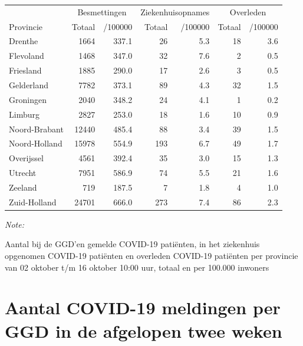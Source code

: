 \documentclass[
  english,
  man,floatsintext]{apa6}
\begin{document}
\begin{table}[H]
\centering
\begin{threeparttable}
\begin{tabular}{lrrrrrr}
\toprule
\multicolumn{1}{c}{ } & \multicolumn{2}{c}{Besmettingen} & \multicolumn{2}{c}{Ziekenhuisopnames} & \multicolumn{2}{c}{Overleden} \\
\cmidrule(l{3pt}r{3pt}){2-3} \cmidrule(l{3pt}r{3pt}){4-5} \cmidrule(l{3pt}r{3pt}){6-7}
Provincie & Totaal & /100000 & Totaal & /100000 & Totaal & /100000\\
\midrule
Drenthe & 1664 & 337.1 & 26 & 5.3 & 18 & 3.6\\
Flevoland & 1468 & 347.0 & 32 & 7.6 & 2 & 0.5\\
Friesland & 1885 & 290.0 & 17 & 2.6 & 3 & 0.5\\
Gelderland & 7782 & 373.1 & 89 & 4.3 & 32 & 1.5\\
Groningen & 2040 & 348.2 & 24 & 4.1 & 1 & 0.2\\
Limburg & 2827 & 253.0 & 18 & 1.6 & 10 & 0.9\\
Noord-Brabant & 12440 & 485.4 & 88 & 3.4 & 39 & 1.5\\
Noord-Holland & 15978 & 554.9 & 193 & 6.7 & 49 & 1.7\\
Overijssel & 4561 & 392.4 & 35 & 3.0 & 15 & 1.3\\
Utrecht & 7951 & 586.9 & 74 & 5.5 & 21 & 1.6\\
Zeeland & 719 & 187.5 & 7 & 1.8 & 4 & 1.0\\
Zuid-Holland & 24701 & 666.0 & 273 & 7.4 & 86 & 2.3\\
\bottomrule
\end{tabular}
\begin{tablenotes}
\item \textit{Note: } 
\item Aantal bij de GGD’en gemelde COVID-19 patiënten, in het ziekenhuis opgenomen COVID-19 patiënten en overleden COVID-19 patiënten per provincie van 02 oktober t/m 16 oktober 10:00 uur, totaal en per 100.000 inwoners
\end{tablenotes}
\end{threeparttable}
\end{table}

\newpage

\hypertarget{aantal-covid-19-meldingen-per-ggd-in-de-afgelopen-twee-weken}{%
\section{Aantal COVID-19 meldingen per GGD in de afgelopen twee weken}\label{aantal-covid-19-meldingen-per-ggd-in-de-afgelopen-twee-weken}}
\end{document}
